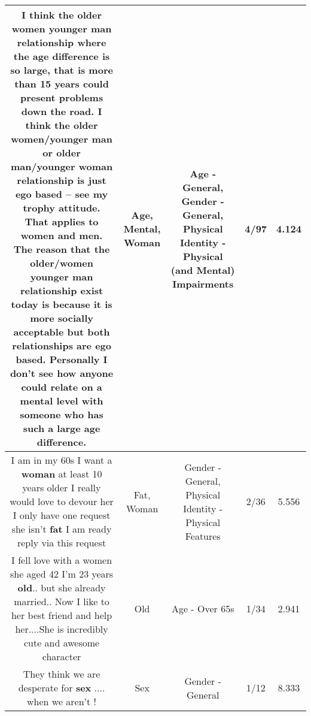 \documentclass[11pt]{article}
\newlength\mylength
\begin{document}
\begin{center}
\begin{longtable}{|C{.65\mylength}|C{.30\mylength}|C{.12\mylength}|C{.12\mylength}|C{.12\mylength}|}
  \small I think the older women younger man relationship where the \textbf{age} difference is so large, that is more than 15 years could present problems down the road. I think the older women/younger man or older man/younger \textbf{woman} relationship is just ego based -- see my trophy attitude. That applies to women and men. The reason that the older/women younger man relationship exist today is because it is more socially acceptable but both relationships are ego based.  Personally I don't see how anyone could relate on a \textbf{mental} level with someone who has such a large \textbf{age} difference.\normalsize   & Age, Mental, Woman & Age - General, Gender - General, Physical Identity - Physical (and Mental) Impairments & 4/97 & 4.124 \\  \hline
  \small I am in my 60s I want a \textbf{woman} at least 10 years older I really would love to devour her I only have one request she isn't \textbf{fat} I am ready reply via this request\normalsize   & Fat, Woman & Gender - General, Physical Identity - Physical Features & 2/36 & 5.556 \\  \hline
  \small I fell  love with a women she aged 42 I'm 23 years \textbf{old}.. but she already  married..  Now I like to her best friend and help her....She is incredibly cute and awesome  character\normalsize   & Old & Age - Over 65s & 1/34 & 2.941 \\  \hline
  \small They think we are desperate for \textbf{sex} .... when we aren't !\normalsize   & Sex & Gender - General & 1/12 & 8.333 \\  \hline

\end{longtable}
\end{center}
\end{document}
